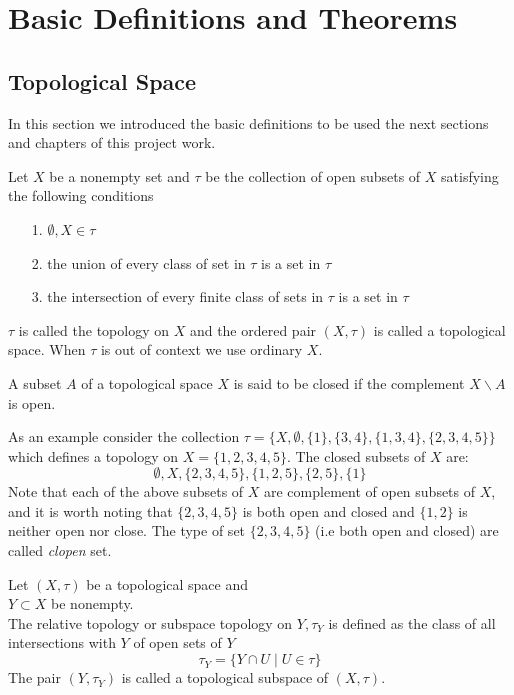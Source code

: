 \chapter{Basic Definitions and Theorems}

\section{Topological Space}
In this section we introduced the basic definitions to be used the next sections and chapters of this project work.

\begin{defn}
    Let $X$ be a nonempty set and $\tau$ be the collection of open subsets of $X$ satisfying the following conditions
    \begin{itemize}
        \item[1.] $\emptyset, X \in \tau$
        \item[2.] the union of every class of set in $\tau$ is a set in $\tau$
        \item[3.] the intersection of every finite class of sets in $\tau$ is a set in $\tau$
    \end{itemize}
    $\tau$ is called the topology on $X$ and the ordered pair $(X, \tau)$ is called a topological space. When $\tau$ is out of context we use ordinary $X$.
\end{defn}

\begin{defn}
    A subset $A$ of a topological space $X$ is said to be closed if the complement $X \backslash A$ is open.
\end{defn}
As an example consider the collection $\tau  = \{ X, \emptyset, \{1\}, \{3,4\},\{1,3,4\}, \{2,3,4,5\} \}$ which defines a topology on $X  = \{1,2,3,4,5\}$. The closed subsets of $X$ are:
\[
    \emptyset, X, \{2,3,4,5\}, \{1,2,5\}, \{2,5\},\{1\}  
\]
Note that each of the above subsets of $X$ are complement of open subsets of $X$, and it is worth noting that $\{2,3,4,5\}$ is both open and closed and $\{1,2\}$ is neither open nor close.\newline
The type of set $\{2,3,4,5\}$ (i.e both open and closed) are called \textit{clopen} set.

\begin{defn}[Subspace]
    Let $(X, \tau)$ be a topological space and\\
     $Y \subset X$ be nonempty.\\
    The relative topology or subspace topology on $Y, \tau_Y$ is defined as the class of all intersections with $Y$ of open sets of $Y$
    \[
        \tau_Y = \{Y \cap U  \mid U \in \tau\}
    \]
    The pair $(Y, \tau_Y)$ is called a topological subspace of $(X, \tau)$.
\end{defn}

